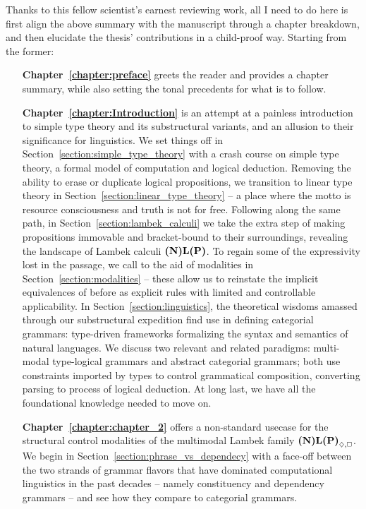 {Thanks to this fellow scientist's earnest reviewing work, all I need to do here is first align the above summary with the manuscript through a chapter breakdown, and then elucidate the thesis' contributions in a child-proof way.
Starting from the former:
\begin{enumerate}[labelindent=2pt, itemindent=30pt, labelsep=5pt, widest=Chapter III,align=right,itemsep=5pt]
\item[\textbf{Chapter~\ref{chapter:preface}}] greets the reader and provides a chapter summary, while also setting the tonal precedents for what is to follow.
\item[\textbf{Chapter~\ref{chapter:Introduction}}] is an attempt at a painless introduction to simple type theory and its substructural variants, and an allusion to their significance for linguistics.
We set things off in Section~\ref{section:simple_type_theory} with a crash course on simple type theory, a formal model of computation and logical deduction.
Removing the ability to erase or duplicate logical propositions, we transition to linear type theory in Section~\ref{section:linear_type_theory} -- a place where the motto is resource consciousness and truth is not for free.
Following along the same path, in Section~\ref{section:lambek_calculi} we take the extra step of making propositions immovable and bracket-bound to their surroundings, revealing the landscape of Lambek calculi $\textbf{(N)L(P)}$.
To regain some of the expressivity lost in the passage, we call to the aid of modalities in Section~\ref{section:modalities} -- these allow us to reinstate the implicit equivalences of before as explicit rules with limited and controllable applicability.
In Section~\ref{section:linguistics}, the theoretical wisdoms amassed through our substructural expedition find use in defining categorial grammars: type-driven frameworks formalizing the syntax and semantics of natural languages.
We discuss two relevant and related paradigms: multi-modal type-logical grammars and abstract categorial grammars; both use constraints imported by types to control grammatical composition, converting parsing to process of logical deduction.
At long last, we have all the foundational knowledge needed to move on.
\item[\textbf{Chapter~\ref{chapter:chapter_2}}] offers a non-standard usecase for the structural control modalities of the multimodal Lambek family $\logic{(N)L(P)}_{\diamond, \bx}$.
We begin in Section~\ref{section:phrase_vs_dependecy} with a face-off between the two strands of grammar flavors that have dominated computational linguistics in the past decades -- namely constituency  and dependency grammars -- and see how they compare to categorial grammars.

\end{enumerate}}
